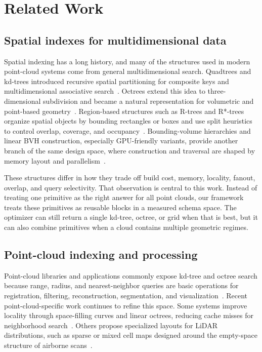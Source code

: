\section{Related Work}
\label{sec:related-work}

\subsection{Spatial indexes for multidimensional data}

Spatial indexing has a long history, and many of the structures used in modern point-cloud systems come from general multidimensional search. Quadtrees and kd-trees introduced recursive spatial partitioning for composite keys and multidimensional associative search~\cite{finkel1974quadtrees,bentley1975kdtree}. Octrees extend this idea to three-dimensional subdivision and became a natural representation for volumetric and point-based geometry~\cite{meagher1980octree,samet2006foundations}. Region-based structures such as R-trees and R*-trees organize spatial objects by bounding rectangles or boxes and use split heuristics to control overlap, coverage, and occupancy~\cite{guttman1984rtree,beckmann1990rstar}. Bounding-volume hierarchies and linear BVH construction, especially GPU-friendly variants, provide another branch of the same design space, where construction and traversal are shaped by memory layout and parallelism~\cite{karras2012lbvh}.

These structures differ in how they trade off build cost, memory, locality, fanout, overlap, and query selectivity. That observation is central to this work. Instead of treating one primitive as the right answer for all point clouds, our framework treats these primitives as reusable blocks in a measured schema space. The optimizer can still return a single kd-tree, octree, or grid when that is best, but it can also combine primitives when a cloud contains multiple geometric regimes.

\subsection{Point-cloud indexing and processing}

Point-cloud libraries and applications commonly expose kd-tree and octree search because range, radius, and nearest-neighbor queries are basic operations for registration, filtering, reconstruction, segmentation, and visualization~\cite{rusu2011pcl}. Recent point-cloud-specific work continues to refine this space. Some systems improve locality through space-filling curves and linear octrees, reducing cache misses for neighborhood search~\cite{vinambres2026linearoctrees}. Others propose specialized layouts for LiDAR distributions, such as sparse or mixed cell maps designed around the empty-space structure of airborne scans~\cite{laso2025cheesemap}.

